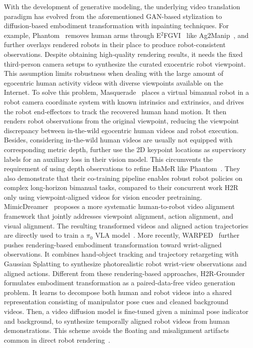 \documentclass[Afour,sageh,times]{sagej}
\begin{document}
With the development of generative modeling, the underlying video translation paradigm has evolved from the aforementioned GAN-based stylization to diffusion-based embodiment transformation with inpainting techniques. For example, Phantom~\citep{lepert2025phantom} removes human arms through E$^2$FGVI~\citep{li2022towards} like Ag2Manip~\citep{li2024ag2manip}, and further overlays rendered robots in their place to produce robot-consistent observations. Despite obtaining high-quality rendering results, it needs the fixed third-person camera setups to synthesize the curated exocentric robot viewpoint. This assumption limits robustness when dealing with the large amount of egocentric human activity videos with diverse viewpoints available on the Internet. 
To solve this problem, Masquerade~\citep{lepert2025masquerade} places a virtual bimanual robot in a robot camera coordinate system with known intrinsics and extrinsics, and drives the robot end-effectors to track the recovered human hand motion. It then renders robot observations from the original viewpoint, reducing the viewpoint discrepancy between in-the-wild egocentric human videos and robot execution.
Besides, considering in-the-wild human videos are usually not equipped with corresponding metric depth, \cite{lepert2025masquerade} further use the 2D keypoint locations as supervisory labels for an auxiliary loss in their vision model. This circumvents the requirement of using depth observations to refine HaMeR like Phantom~\citep{lepert2025phantom}. They also demonstrate that their co-training pipeline enables robust robot policies on complex long-horizon bimanual tasks, compared to their concurrent work H2R~\citep{li2025h2r} only using viewpoint-aligned videos for vision encoder pretraining. MimicDreamer~\citep{li2025mimicdreamer} proposes a more systematic human-to-robot video alignment framework that jointly addresses viewpoint alignment, action alignment, and visual alignment. The resulting transformed videos and aligned action trajectories are directly used to train a $\pi_0$ VLA model~\citep{black2024pi_0}. More recently, WARPED~\citep{freeman2026warped} further pushes rendering-based embodiment transformation toward wrist-aligned observations. It combines hand-object tracking and trajectory retargeting with Gaussian Splatting to synthesize photorealistic robot wrist-view observations and aligned actions. Different from these rendering-based approaches, H2R-Grounder~\citep{ci2025h2r} formulates embodiment transformation as a paired-data-free video generation problem. It learns to decompose both human and robot videos into a shared representation consisting of manipulator pose cues and cleaned background videos. Then, a video diffusion model is fine-tuned given a minimal pose indicator and background, to synthesize temporally aligned robot videos from human demonstrations. This scheme avoids the floating and misalignment artifacts common in direct robot rendering~\citep{lepert2025masquerade,li2025h2r}.
\end{document}
